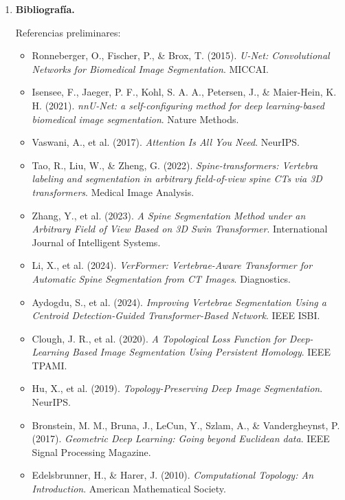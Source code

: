 \documentclass[8pt,a4paper]{article}
\begin{document}
\begin{enumerate}[leftmargin=0.8cm,label=\arabic*.,itemsep=0.85em]
    \textbf{Viabilidad y recursos.} El plan es viable porque el dataset ya se encuentra identificado y estructurado, existen expertos de dominio que respaldan la evaluación y la infraestructura requerida se limita a recursos de cómputo con GPU, gestión de experimentos y orquestación paralela. El diseño considera como deseable la futura portabilidad a escenarios de recursos limitados, por lo que se medirán explícitamente memoria y tiempo de inferencia desde la etapa experimental.

	\newpage    
    \item \textbf{Bibliografía.}

    Referencias preliminares:
    \begin{itemize}[leftmargin=0.6cm,itemsep=0.2em]
        \item Ronneberger, O., Fischer, P., \& Brox, T. (2015). \textit{U-Net: Convolutional Networks for Biomedical Image Segmentation}. MICCAI.
        \item Isensee, F., Jaeger, P. F., Kohl, S. A. A., Petersen, J., \& Maier-Hein, K. H. (2021). \textit{nnU-Net: a self-configuring method for deep learning-based biomedical image segmentation}. Nature Methods.
        \item Vaswani, A., et al. (2017). \textit{Attention Is All You Need}. NeurIPS.
        \item Tao, R., Liu, W., \& Zheng, G. (2022). \textit{Spine-transformers: Vertebra labeling and segmentation in arbitrary field-of-view spine CTs via 3D transformers}. Medical Image Analysis.
        \item Zhang, Y., et al. (2023). \textit{A Spine Segmentation Method under an Arbitrary Field of View Based on 3D Swin Transformer}. International Journal of Intelligent Systems.
        \item Li, X., et al. (2024). \textit{VerFormer: Vertebrae-Aware Transformer for Automatic Spine Segmentation from CT Images}. Diagnostics.
        \item Aydogdu, S., et al. (2024). \textit{Improving Vertebrae Segmentation Using a Centroid Detection-Guided Transformer-Based Network}. IEEE ISBI.
        \item Clough, J. R., et al. (2020). \textit{A Topological Loss Function for Deep-Learning Based Image Segmentation Using Persistent Homology}. IEEE TPAMI.
        \item Hu, X., et al. (2019). \textit{Topology-Preserving Deep Image Segmentation}. NeurIPS.
        \item Bronstein, M. M., Bruna, J., LeCun, Y., Szlam, A., \& Vandergheynst, P. (2017). \textit{Geometric Deep Learning: Going beyond Euclidean data}. IEEE Signal Processing Magazine.
        \item Edelsbrunner, H., \& Harer, J. (2010). \textit{Computational Topology: An Introduction}. American Mathematical Society.
    \end{itemize}

\end{enumerate}
\end{document}
